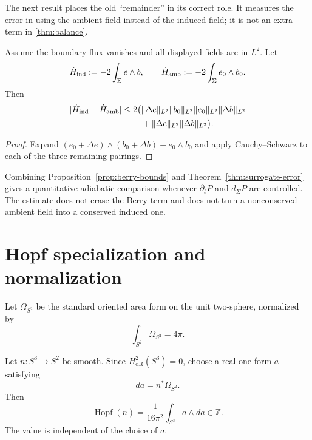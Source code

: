 \documentclass[11pt]{article}
\begin{document}
The next result places the old ``remainder'' in its correct role.  It measures
the error in using the ambient field instead of the induced field; it is not an
extra term in \cref{thm:balance}.

\par\medskip
\begin{theorem}\label{thm:surrogate-error}
Assume the boundary flux vanishes and all displayed fields are in \(L^2\).
Let
\[
\dot H_{\rm ind}:=-2\int_\Sigma e\wedge b,
\qquad
\dot H_{\rm amb}:=-2\int_\Sigma e_0\wedge b_0.
\]
Then
\begin{align}
|\dot H_{\rm ind}-\dot H_{\rm amb}|
\le 2\bigl(&\|\Delta e\|_{L^2}\|b_0\|_{L^2}
 \|e_0\|_{L^2}\|\Delta b\|_{L^2}\notag\\
&+\|\Delta e\|_{L^2}\|\Delta b\|_{L^2}\bigr).
\label{eq:surrogate-bound}
\end{align}
\end{theorem}

\begin{proof}
Expand
\((e_0+\Delta e)\wedge(b_0+\Delta b)-e_0\wedge b_0\)
and apply Cauchy--Schwarz to each of the three remaining pairings.
\end{proof}

\par\medskip
Combining Proposition~\ref{prop:berry-bounds} and
Theorem~\ref{thm:surrogate-error} gives a quantitative
adiabatic comparison whenever \(\partial_tP\) and \(d_\Sigma P\) are
controlled.  The estimate does not erase the Berry term and does not turn a
nonconserved ambient field into a conserved induced one.

\section{Hopf specialization and normalization}
\label{sec:hopf}

Let \(\Omega_{S^2}\) be the standard oriented area form on the unit
two-sphere, normalized by
\[
\int_{S^2}\Omega_{S^2}=4\pi.
\]

\begin{theorem}
\label{thm:hopf}
Let \(n:S^3\to S^2\) be smooth.  Since
\(H^2_{\mathrm{dR}}(S^3)=0\), choose a real one-form \(a\) satisfying
\[
da=n^*\Omega_{S^2}.
\]
Then
\[
\operatorname{Hopf}(n)
=\frac{1}{16\pi^2}\int_{S^3}a\wedge da
\in\mathbb Z.
\]
The value is independent of the choice of \(a\).
\end{theorem}
\end{document}
